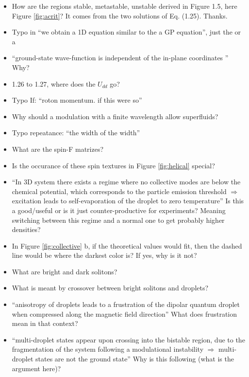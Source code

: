 \begin{itemize}
        \item How are the regions stable, metastable, unstable derived in Figure 1.5, here Figure \ref{fig:acrit}? 
        {\color{red}
            It comes from the two solutions of Eq. (1.25).
        }
        {\color{green}
            Thanks.
        }

\end{itemize}

\begin{itemize}
        \item Typo in ``we obtain a 1D equation similar to the a GP equation'', just the or a
        \item ``ground-state wave-function is independent of the in-plane coordinates '' Why?
        \item 1.26 to 1.27, where does the $U_{dd}$ go?
        \item Typo If: ``roton momentum. if this were so''
        \item Why should a modulation with a finite wavelength allow superfluids?
        \item Typo repeatance: ``the width of the width''
        \item What are the spin-F matrizes?
        \item Is the occurance of these spin textures in Figure \ref{fig:helical} special?
        \item ``In 3D system there exists a regime where no collective modes are below the chemical potential, which corresponds to the particle emission threshold $\Rightarrow$ excitation leads to self-evaporation of the droplet to zero temperature'' Is this a good/useful or is it just counter-productive for experiments? Meaning switching between this regime and a normal one to get probably higher densities?
        \item In Figure \ref{fig:collective} b, if the theoretical values would fit, then the dashed line would be where the darkest color is? If yes, why is it not?
        \item What are bright and dark solitons?
        \item What is meant by crossover between bright solitons and droplets?
        \item ``anisotropy of droplets leads to a frustration of the dipolar quantum droplet when
compressed along the magnetic field direction'' What does frustration mean in that context?
        \item ``multi-droplet states appear upon crossing into the bistable region, due to the fragmentation of the system following a modulational instability $\Rightarrow$ multi-droplet states are not the ground state'' Why is this following (what is the argument here)?

\end{itemize}
